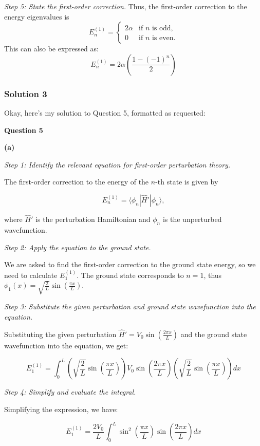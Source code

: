 \documentclass{article}
\begin{document}
\textit{Step 5: State the first-order correction.}
Thus, the first-order correction to the energy eigenvalues is
\[ E_n^{(1)} = 
\begin{cases}
2\alpha & \text{if } n \text{ is odd}, \\
0 & \text{if } n \text{ is even}.
\end{cases}
\]
This can also be expressed as:
\[ E_n^{(1)} = 2\alpha \left(\frac{1-(-1)^n}{2}\right) \]

\subsubsection{Solution 3}
Okay, here's my solution to Question 5, formatted as requested:

\textbf{Question 5}

\textbf{(a)}

\textit{Step 1: Identify the relevant equation for first-order perturbation theory.}

The first-order correction to the energy of the \(n\)-th state is given by

\[
E_n^{(1)} = \langle \phi_n | \hat{H}' | \phi_n \rangle,
\]

where \(\hat{H}'\) is the perturbation Hamiltonian and \(\phi_n\) is the unperturbed wavefunction.

\textit{Step 2: Apply the equation to the ground state.}

We are asked to find the first-order correction to the ground state energy, so we need to calculate \(E_1^{(1)}\). The ground state corresponds to \(n=1\), thus \(\phi_1(x) = \sqrt{\frac{2}{L}} \sin\left(\frac{\pi x}{L}\right)\).

\textit{Step 3: Substitute the given perturbation and ground state wavefunction into the equation.}

Substituting the given perturbation \(\hat{H}' = V_0 \sin\left(\frac{2\pi x}{L}\right)\) and the ground state wavefunction into the equation, we get:

\[
E_1^{(1)} = \int_0^L \left(\sqrt{\frac{2}{L}} \sin\left(\frac{\pi x}{L}\right)\right) V_0 \sin\left(\frac{2\pi x}{L}\right) \left(\sqrt{\frac{2}{L}} \sin\left(\frac{\pi x}{L}\right)\right) dx
\]

\textit{Step 4: Simplify and evaluate the integral.}

Simplifying the expression, we have:

\[
E_1^{(1)} = \frac{2V_0}{L} \int_0^L \sin^2\left(\frac{\pi x}{L}\right) \sin\left(\frac{2\pi x}{L}\right) dx
\]
\end{document}
